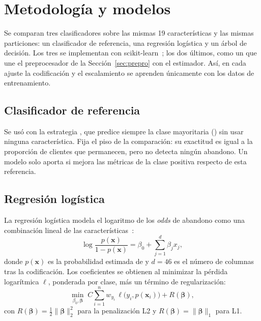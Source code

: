 \section{Metodología y modelos}
\label{sec:modelos}

Se comparan tres clasificadores sobre las mismas 19 características y las mismas particiones: un
clasificador de referencia, una regresión logística y un árbol de decisión. Los tres se implementan
con scikit-learn~\cite{sklearn}; los dos últimos, como un  que une el preprocesador de
la Sección~\ref{sec:prepro} con el estimador. Así, en cada ajuste la codificación y el escalamiento
se aprenden únicamente con los datos de entrenamiento.

\subsection{Clasificador de referencia}
Se usó  con la estrategia , que predice siempre la clase
mayoritaria () sin usar ninguna característica. Fija el piso de la comparación: su exactitud es igual
a la proporción de clientes que permanecen, pero no detecta ningún abandono. Un modelo solo aporta si
mejora las métricas de la clase positiva respecto de esta referencia.

\subsection{Regresión logística}
La regresión logística modela el logaritmo de los \emph{odds} de abandono como una combinación lineal
de las características~\cite{esl}:
\begin{equation}
    \log\frac{p(\mathbf{x})}{1-p(\mathbf{x})}=\beta_0+\sum_{j=1}^{d}\beta_j x_j ,
\end{equation}
donde $p(\mathbf{x})$ es la probabilidad estimada de  y $d=46$ es el número de columnas
tras la codificación. Los coeficientes se obtienen al minimizar la pérdida logarítmica $\ell$,
ponderada por clase, más un término de regularización:
\begin{equation}
    \min_{\beta_0,\boldsymbol{\beta}}\; C\sum_{i=1}^{n} w_{y_i}\,\ell\bigl(y_i,p(\mathbf{x}_i)\bigr)+R(\boldsymbol{\beta}),
    \label{eq:logistica}
\end{equation}
con $R(\boldsymbol{\beta})=\tfrac{1}{2}\lVert\boldsymbol{\beta}\rVert_2^2$ para la penalización L2 y
$R(\boldsymbol{\beta})=\lVert\boldsymbol{\beta}\rVert_1$ para L1.

